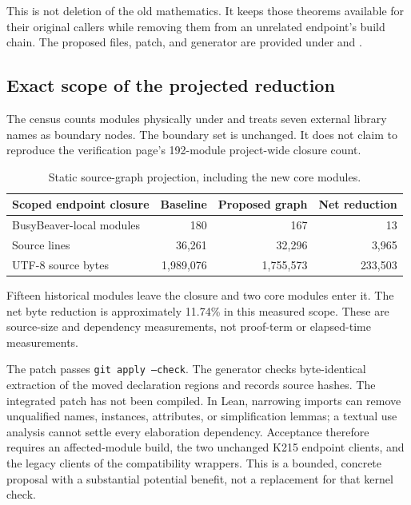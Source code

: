 \documentclass[11pt,letterpaper]{article}
\newcommand{\code}[1]{\texttt{\small #1}}
\begin{document}
This is not deletion of the old mathematics. It keeps those theorems available for
their original callers while removing them from an unrelated endpoint's build chain.
The proposed files, patch, and generator are provided under  and
.

\subsection{Exact scope of the projected reduction}

The census counts modules physically under  and
treats seven external library names as boundary nodes. The boundary set is unchanged.
It does not claim to reproduce the verification page's 192-module project-wide
closure count.

\begin{table}[ht]
\centering\small
\begin{tabular}{@{}lrrr@{}}
\toprule
Scoped endpoint closure & Baseline & Proposed graph & Net reduction\\
\midrule
BusyBeaver-local modules & 180 & 167 & 13\\
Source lines & 36,261 & 32,296 & 3,965\\
UTF-8 source bytes & 1,989,076 & 1,755,573 & 233,503\\
\bottomrule
\end{tabular}
\caption{Static source-graph projection, including the new core modules.}
\end{table}

Fifteen historical modules leave the closure and two core modules enter it. The net
byte reduction is approximately 11.74\% in this measured scope. These are source-size
and dependency measurements, not proof-term or elapsed-time measurements.

The patch passes \code{git apply --check}. The generator checks byte-identical
extraction of the moved declaration regions and records source hashes. The integrated
patch has not been compiled. In Lean, narrowing imports can remove unqualified names,
instances, attributes, or simplification lemmas; a textual use analysis cannot settle
every elaboration dependency. Acceptance therefore requires an affected-module build,
the two unchanged K215 endpoint clients, and the legacy clients of the compatibility
wrappers. This is a bounded, concrete proposal with a substantial potential benefit,
not a replacement for that kernel check.
\end{document}
